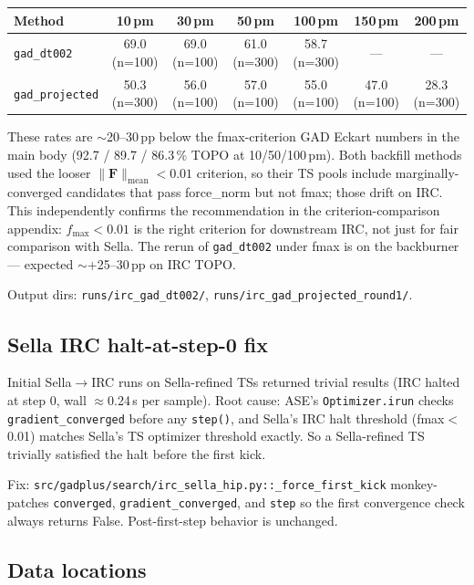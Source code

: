 \documentclass[11pt]{article}
\begin{document}
\begin{center}
\begin{tabular}{lcccccc}
\toprule
Method & 10\,pm & 30\,pm & 50\,pm & 100\,pm & 150\,pm & 200\,pm \\
\midrule
\texttt{gad\_dt002}     & 69.0 (n=100) & 69.0 (n=100) & 61.0 (n=300) & 58.7 (n=300) & --- & --- \\
\texttt{gad\_projected} & 50.3 (n=300) & 56.0 (n=100) & 57.0 (n=100) & 55.0 (n=100) & 47.0 (n=100) & 28.3 (n=300) \\
\bottomrule
\end{tabular}
\end{center}

These rates are $\sim$20--30\,pp below the fmax-criterion GAD Eckart numbers
in the main body (92.7 / 89.7 / 86.3\,\% TOPO at 10/50/100\,pm). Both
backfill methods used the looser $\|\mathbf{F}\|_{\text{mean}}{<}0.01$
criterion, so their TS pools include marginally-converged candidates that
pass force\_norm but not fmax; those drift on IRC. This independently
confirms the recommendation in the criterion-comparison appendix:
$f_{\max}{<}0.01$ is the right criterion for downstream IRC, not just for
fair comparison with Sella. The rerun of \texttt{gad\_dt002} under fmax
is on the backburner --- expected $\sim$+25--30\,pp on IRC TOPO.

Output dirs: \texttt{runs/irc\_gad\_dt002/},
\texttt{runs/irc\_gad\_projected\_round1/}.

\clearpage
\subsection{Sella IRC halt-at-step-0 fix}

Initial Sella$\to$IRC runs on Sella-refined TSs returned trivial
results (IRC halted at step 0, wall $\approx$0.24\,s per sample). Root
cause: ASE's \texttt{Optimizer.irun} checks \texttt{gradient\_converged}
before any \texttt{step()}, and Sella's IRC halt threshold (fmax$<$0.01)
matches Sella's TS optimizer threshold exactly. So a Sella-refined TS
trivially satisfied the halt before the first kick.

Fix: \texttt{src/gadplus/search/irc\_sella\_hip.py::\_force\_first\_kick}
monkey-patches \texttt{converged}, \texttt{gradient\_converged}, and
\texttt{step} so the first convergence check always returns False.
Post-first-step behavior is unchanged.

\subsection{Data locations}
\end{document}
